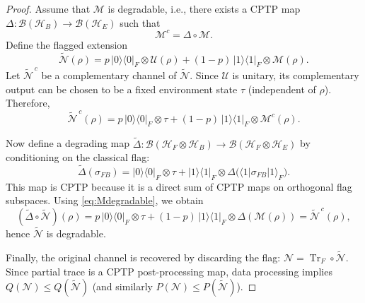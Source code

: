 \documentclass[11pt]{article}
\theoremstyle{plain}
\theoremstyle{definition}
\numberwithin{equation}{section}
\begin{document}
\begin{proof}
Assume that $\mathcal{M}$ is degradable, i.e., there exists a CPTP map
$\Delta: \mathcal{B}(\mathcal{H}_B)\to\mathcal{B}(\mathcal{H}_E)$ such that
\begin{equation}\label{eq:Mdegradable}
\mathcal{M}^{c}=\Delta\circ\mathcal{M}.
\end{equation}
Define the flagged extension
\[
\widetilde{\mathcal{N}}(\rho)
=
p\,|0\rangle\!\langle 0|_F\otimes \mathcal{U}(\rho)
+
(1-p)\,|1\rangle\!\langle 1|_F\otimes \mathcal{M}(\rho).
\]
Let $\widetilde{\mathcal{N}}^{\,c}$ be a complementary channel of $\widetilde{\mathcal{N}}$.
Since $\mathcal{U}$ is unitary, its complementary output can be chosen to be a fixed
environment state $\tau$ (independent of $\rho$). Therefore,
\[
\widetilde{\mathcal{N}}^{\,c}(\rho)
=
p\,|0\rangle\!\langle 0|_F\otimes \tau
+
(1-p)\,|1\rangle\!\langle 1|_F\otimes \mathcal{M}^{c}(\rho).
\]

Now define a degrading map $\widetilde{\Delta}: \mathcal{B}(\mathcal{H}_F\otimes\mathcal{H}_B)
\to \mathcal{B}(\mathcal{H}_F\otimes\mathcal{H}_E)$ by conditioning on the classical flag:
\[
\widetilde{\Delta}(\sigma_{FB})
=
|0\rangle\!\langle 0|_F\otimes \tau
+
|1\rangle\!\langle 1|_F\otimes \Delta\bigl(\langle 1|\sigma_{FB}|1\rangle_F\bigr).
\]
This map is CPTP because it is a direct sum of CPTP maps on orthogonal flag subspaces.
Using \eqref{eq:Mdegradable}, we obtain
\[
(\widetilde{\Delta}\circ \widetilde{\mathcal{N}})(\rho)
=
p\,|0\rangle\!\langle 0|_F\otimes \tau
+
(1-p)\,|1\rangle\!\langle 1|_F\otimes \Delta(\mathcal{M}(\rho))
=
\widetilde{\mathcal{N}}^{\,c}(\rho),
\]
hence $\widetilde{\mathcal{N}}$ is degradable.

Finally, the original channel is recovered by discarding the flag:
$\mathcal{N}=\operatorname{Tr}_F\circ \widetilde{\mathcal{N}}$.
Since partial trace is a CPTP post-processing map, data processing implies
$Q(\mathcal{N})\le Q(\widetilde{\mathcal{N}})$ (and similarly $P(\mathcal{N})\le P(\widetilde{\mathcal{N}})$).
\end{proof}
\end{document}
